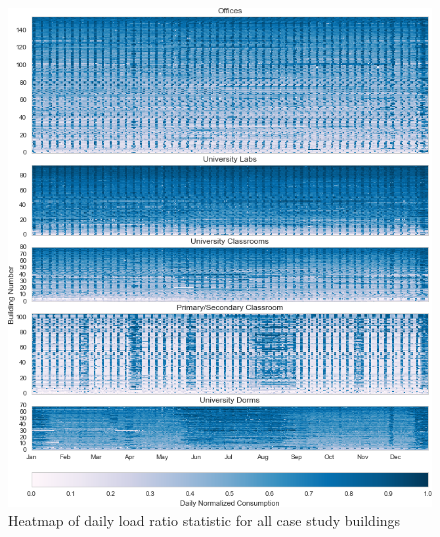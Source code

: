 \begin{figure}[ht!]
\begin{center}
\includegraphics[width=1\columnwidth]{figures/loadratio_heatmap/loadratio_heatmap}
\caption{Heatmap of daily load ratio statistic for all case study buildings
\label{fig:loadratio_heatmap}%
}
\end{center}
\end{figure}

